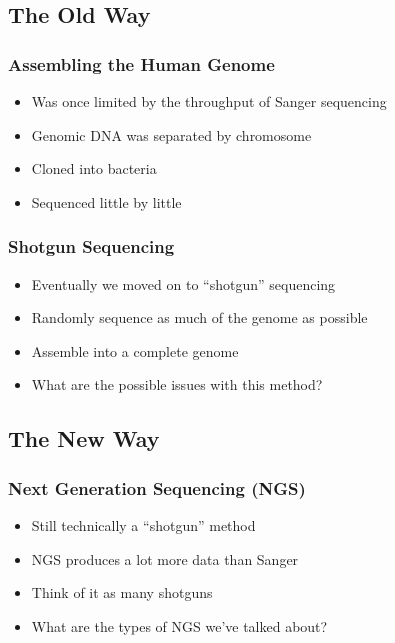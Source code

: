 \documentclass[14pt,handout]{beamer}
\begin{document}
\subsection{The Old Way}

\begin{frame}
\frametitle{Assembling the Human Genome}
\begin{itemize}
	\item<+-> Was once limited by the throughput of Sanger sequencing
	\item<+-> Genomic DNA was separated by chromosome
	\item<+-> Cloned into bacteria
	\item<+-> Sequenced little by little
\end{itemize}
\end{frame}

\begin{frame}
\frametitle{Shotgun Sequencing}
\begin{itemize}
	\item<+-> Eventually we moved on to ``shotgun'' sequencing
	\item<+-> Randomly sequence as much of the genome as possible
	\item<+-> Assemble into a complete genome
	\item<+-> What are the possible issues with this method?
\end{itemize}
\end{frame}

\subsection{The New Way}

\begin{frame}
\frametitle{Next Generation Sequencing (NGS)}
\begin{itemize}
	\item<+-> Still technically a ``shotgun'' method
	\item<+-> NGS produces a lot more data than Sanger
	\item<+-> Think of it as many shotguns
	\item<+-> What are the types of NGS we've talked about?
\end{itemize}
\end{frame}
\end{document}
